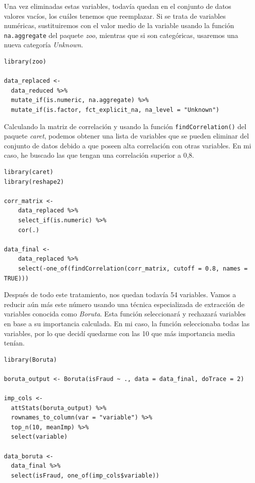 Una vez eliminadas estas variables, todavía quedan en el conjunto de datos
valores vacíos, los cuáles tenemos que reemplazar. Si se trata de variables
numéricas, sustituiremos con el valor medio de la variable usando la función
\lstinline{na.aggregate} del paquete \textit{zoo}, mientras que si son
categóricas, usaremos una nueva categoría \textit{Unknown}.

\begin{lstlisting}
library(zoo)

data_replaced <-
  data_reduced %>%
  mutate_if(is.numeric, na.aggregate) %>%
  mutate_if(is.factor, fct_explicit_na, na_level = "Unknown")
\end{lstlisting}

Calculando la matriz de correlación y usando la función
\lstinline{findCorrelation()} del paquete \textit{caret}, podemos obtener una
lista de variables que se pueden eliminar del conjunto de datos debido a que
poseen alta correlación con otras variables. En mi caso, he buscado las que
tengan una correlación superior a 0,8.

\begin{lstlisting}
library(caret)
library(reshape2)

corr_matrix <-
    data_replaced %>%
    select_if(is.numeric) %>%
    cor(.)

data_final <-
    data_replaced %>%
    select(-one_of(findCorrelation(corr_matrix, cutoff = 0.8, names = TRUE)))
\end{lstlisting}

Después de todo este tratamiento, nos quedan todavía 54 variables. Vamos a
reducir aún más este número usando una técnica especializada de extracción de
variables conocida como \textit{Boruta}. Esta función seleccionará y rechazará
variables en base a su importancia calculada. En mi caso, la función
seleccionaba todas las variables, por lo que decidí quedarme con las 10 que más
importancia media tenían.

\begin{lstlisting}
library(Boruta)

boruta_output <- Boruta(isFraud ~ ., data = data_final, doTrace = 2)

imp_cols <-
  attStats(boruta_output) %>%
  rownames_to_column(var = "variable") %>%
  top_n(10, meanImp) %>%
  select(variable)

data_boruta <-
  data_final %>%
  select(isFraud, one_of(imp_cols$variable))
\end{lstlisting}

